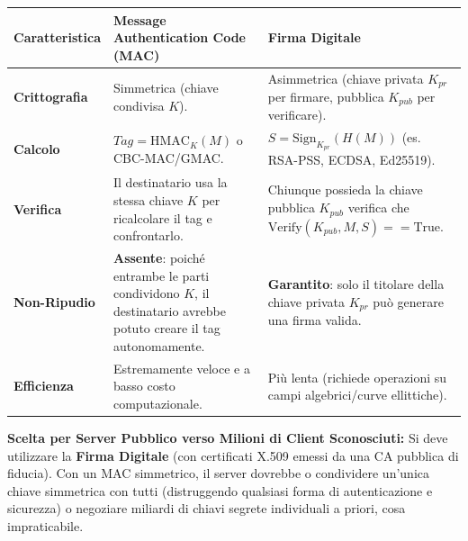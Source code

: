 \documentclass[11pt,a4paper]{article}
\begin{document}
\begin{solutionbox}
\begin{center}
\small
\begin{tabularx}{\textwidth}{lXX}
\toprule
\textbf{Caratteristica} & \textbf{Message Authentication Code (MAC)} & \textbf{Firma Digitale} \\
\midrule
\textbf{Crittografia} & Simmetrica (chiave condivisa $K$). & Asimmetrica (chiave privata $K_{pr}$ per firmare, pubblica $K_{pub}$ per verificare). \\
\textbf{Calcolo} & $Tag = \text{HMAC}_K(M)$ o CBC-MAC/GMAC. & $S = \text{Sign}_{K_{pr}}(H(M))$ (es. RSA-PSS, ECDSA, Ed25519). \\
\textbf{Verifica} & Il destinatario usa la stessa chiave $K$ per ricalcolare il tag e confrontarlo. & Chiunque possieda la chiave pubblica $K_{pub}$ verifica che $\text{Verify}(K_{pub}, M, S) == \text{True}$. \\
\textbf{Non-Ripudio} & \textbf{Assente}: poich\'e entrambe le parti condividono $K$, il destinatario avrebbe potuto creare il tag autonomamente. & \textbf{Garantito}: solo il titolare della chiave privata $K_{pr}$ pu\`o generare una firma valida. \\
\textbf{Efficienza} & Estremamente veloce e a basso costo computazionale. & Pi\`u lenta (richiede operazioni su campi algebrici/curve ellittiche). \\
\bottomrule
\end{tabularx}
\end{center}
\textbf{Scelta per Server Pubblico verso Milioni di Client Sconosciuti:}
Si deve utilizzare la \textbf{Firma Digitale} (con certificati X.509 emessi da una CA pubblica di fiducia). Con un MAC simmetrico, il server dovrebbe o condividere un'unica chiave simmetrica con tutti (distruggendo qualsiasi forma di autenticazione e sicurezza) o negoziare miliardi di chiavi segrete individuali a priori, cosa impraticabile.
\end{solutionbox}
\end{document}
